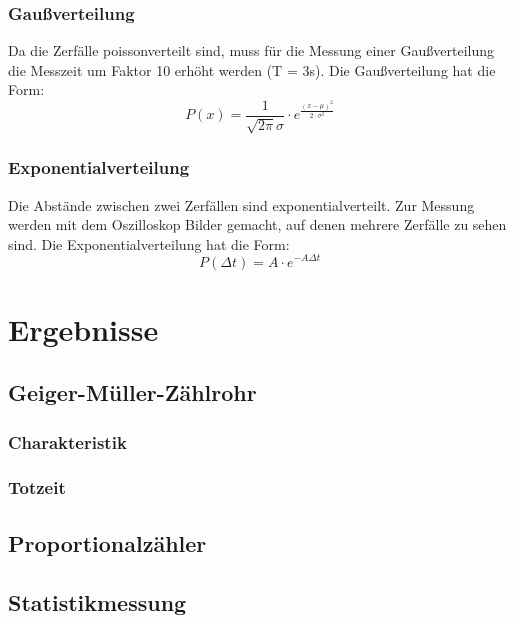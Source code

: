 \documentclass[12pt,a4paper]{article}
\begin{document}
\subsubsection{Gaußverteilung}
Da die Zerfälle poissonverteilt sind, muss für die Messung einer Gaußverteilung die Messzeit um Faktor 10 erhöht werden (T = 3s). Die Gaußverteilung hat die Form:
\begin{equation}
P(x) = \dfrac{1}{\sqrt{2 \pi} \sigma} \cdot e^{\frac{(x - \mu)^2}{2 \cdot \sigma ^2}}
\end{equation}
\subsubsection{Exponentialverteilung}
Die Abstände zwischen zwei Zerfällen sind exponentialverteilt. Zur Messung werden mit dem Oszilloskop Bilder gemacht, auf denen mehrere Zerfälle zu sehen sind. Die Exponentialverteilung hat die Form:
\begin{equation}
P(\Delta t) = A \cdot e^{- A \Delta t}
\end{equation}

\section{Ergebnisse}
\subsection{Geiger-Müller-Zählrohr}
\subsubsection{Charakteristik}
\subsubsection{Totzeit}
\subsection{Proportionalzähler}
\subsection{Statistikmessung}
\end{document}
